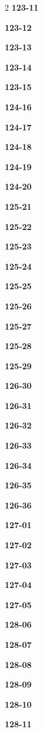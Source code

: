 \documentclass[10pt,a4paper]{article}
\begin{document}
\begin{multicols}{2}
\noindent\textbf{123-11}\ \par
\noindent\textbf{123-12}\ \par
\noindent\textbf{123-13}\ \par
\noindent\textbf{123-14}\ \par
\noindent\textbf{123-15}\ \par
\noindent\textbf{124-16}\ \par
\noindent\textbf{124-17}\ \par
\noindent\textbf{124-18}\ \par
\noindent\textbf{124-19}\ \par
\noindent\textbf{124-20}\ \par
\noindent\textbf{125-21}\ \par
\noindent\textbf{125-22}\ \par
\noindent\textbf{125-23}\ \par
\noindent\textbf{125-24}\ \par
\noindent\textbf{125-25}\ \par
\noindent\textbf{125-26}\ \par
\noindent\textbf{125-27}\ \par
\noindent\textbf{125-28}\ \par
\noindent\textbf{125-29}\ \par
\noindent\textbf{126-30}\ \par
\noindent\textbf{126-31}\ \par
\noindent\textbf{126-32}\ \par
\noindent\textbf{126-33}\ \par
\noindent\textbf{126-34}\ \par
\noindent\textbf{126-35}\ \par
\noindent\textbf{126-36}\ \par
\noindent\textbf{127-01}\ \par
\noindent\textbf{127-02}\ \par
\noindent\textbf{127-03}\ \par
\noindent\textbf{127-04}\ \par
\noindent\textbf{127-05}\ \par
\noindent\textbf{128-06}\ \par
\noindent\textbf{128-07}\ \par
\noindent\textbf{128-08}\ \par
\noindent\textbf{128-09}\ \par
\noindent\textbf{128-10}\ \par
\noindent\textbf{128-11}\ \par

\end{multicols}
\end{document}
